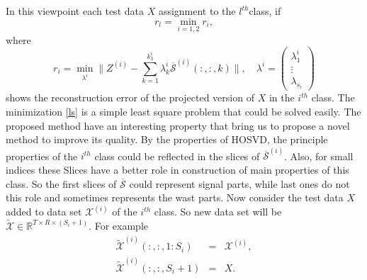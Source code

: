 \documentclass[journal]{IEEEtran}
\begin{document}
	In this viewpoint each test data
	$X$ assignment to the $l^{th}$class, if
	\[
	r_{l}=\min_{i=1,2} {r_{i}},
	\]
	where
	\begin{equation}
	\label{ls}
	r_{i}=\min_{{\lambda^{i}}} \|Z^{(i)} -\sum_{k=1}^{k_3^i} \lambda_k^i \overline{\mathcal{S}}^{(i)}(:,:,k)\|,\quad
	\lambda^i=\begin{pmatrix}
	\lambda_1^i\\
	\vdots\\
	\lambda_{s_i}
	\end{pmatrix}
	\end{equation}
	shows the  reconstruction error of the projected version of $X$ in the $i^{th}$ class.
	The minimization  \eqref{ls} is a simple least square problem that could be solved easily.
	The proposed method have an interesting property that  bring us to propose a novel method to improve its 
	quality.
	By the properties of HOSVD, the principle properties of the $i^{th}$ class could be reflected in the  slices of
	$\overline{\mathcal{S}}^{(i)}$. Also, for small indices these Slices have a  better   role in construction of main properties of this class. So the first slices of $\overline{\mathcal{S}}$
	could represent signal parts, while last ones do not this role and sometimes represents the wast parts.
	Now consider the test data $X$ added to data set $\mathcal{X}^{(i)}$ of the $i^{th}$ class. So new data set will be
	$\mathcal{\widetilde{X}}\in \mathbb{R}^{T\times R \times (S_{i}+1)}$. For example
	\begin{eqnarray*}
		\widetilde{\mathcal{X}}^{(i)}(:,:,1:S_i)&=&{\mathcal{X}}^{(i)},\\
		\widetilde{\mathcal{X}}^{(i)}(:,:,S_i+1)&=&X.
	\end{eqnarray*}
	
\end{document}
